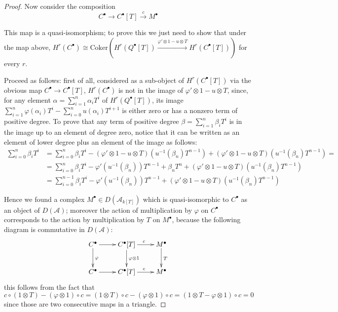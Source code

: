 \documentclass{amsart}
\begin{document}
\begin{proof}
Now consider the composition 
$$
C^\bullet \longrightarrow C^\bullet[T] \xrightarrow{c} M^\bullet
$$

This map is a quasi-isomorphism; to prove this we just need to show that under the map above, $H^{r}(C^{\bullet}) \cong \text{Coker}( H^{r}(Q^{\bullet}[T])\xrightarrow{\varphi' \otimes 1 - u \otimes T}H^{r}(C^{\bullet}[T])) $ for every $r$.
 
Proceed as follows: first of all, considered as a sub-object of $H^{r}(C^{\bullet}[T])$ via the obvious map $C^{\bullet}\to C^{\bullet}[T]$, $H^{r}(C^{\bullet})$ is not in the image of $\varphi' \otimes 1 - u \otimes T$, since, for any element $\alpha=\sum_{i=1}^{n}\alpha_{i} T^{i}$ of $H^{r}(Q^{\bullet}[T])$, its image $\sum_{i=1}^{n}\varphi(\alpha_{i}) T^{i}-\sum_{i=0}^{n}u(\alpha_{i})T^{i+1}$ is either zero or has a nonzero term of positive degree. To prove that any term of positive degree $\beta=\sum_{i=1}^{n}\beta_{i} T^{i}$ is in the image up to an element of degree zero, notice that it can be written as an element of lower degree plus an element of the image as follows:
\begin{align*}
\sum_{i=0}^{n}\beta_{i} T^{i} &=\sum_{i=0}^{n}\beta_{i} T^{i}-(\varphi' \otimes 1 - u \otimes T)(u^{-1}(\beta_{n})T^{n-1})+(\varphi' \otimes 1 - u \otimes T)(u^{-1}(\beta_{n})T^{n-1})= \\
&= \sum_{i=0}^{n}\beta_{i} T^{i}-\varphi'(u^{-1}(\beta_{n}))T^{n-1}+\beta_{n}T^{n} +(\varphi' \otimes 1 - u \otimes T)(u^{-1}(\beta_{n})T^{n-1})\\
&=\sum_{i=0}^{n-1}\beta_{i} T^{i}-\varphi'(u^{-1}(\beta_{n}))T^{n-1}+(\varphi' \otimes 1 - u \otimes T)(u^{-1}(\beta_{n})T^{n-1})
\end{align*}

Hence we found a complex $M^{\bullet}\in D(\mathcal{A}_{k[T]})$ which is quasi-isomorphic to $C^{\bullet}$ as an object of $D(\mathcal{A})$; moreover the action of multiplication by $\varphi$
on $C^\bullet$ corresponds to the action by multiplication by $T$ on $M^\bullet$, because the following diagram is commutative in $D(\mathcal{A})$:
$$
\xymatrix{
C^\bullet \ar[r] \ar[d]^{\varphi} & C^\bullet[T] \ar[r]^{c}\ar[d]^{\varphi\otimes 1} & M^\bullet \ar[d]^{T}\\
C^\bullet \ar[r] & C^\bullet[T] \ar[r]^{c} & M^\bullet
}
$$
this follows from the fact that $c\circ (1\otimes T) - (\varphi \otimes 1)\circ c = (1\otimes T)\circ c - (\varphi \otimes 1)\circ c = (1\otimes T - \varphi \otimes 1)\circ c =0$ since those are two consecutive maps in a triangle. 
\end{proof}
\end{document}
